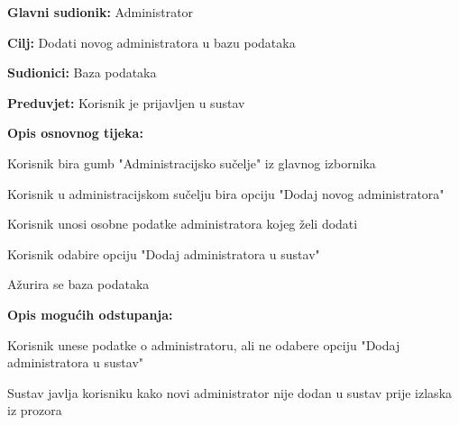 					\noindent {}
					\begin{packed_item}
	
						\item \textbf{Glavni sudionik: } Administrator
						\item  \textbf{Cilj:} Dodati novog administratora u bazu podataka
						\item  \textbf{Sudionici:} Baza podataka
						\item  \textbf{Preduvjet:} Korisnik je prijavljen u sustav
						\item  \textbf{Opis osnovnog tijeka:}
						
						\item[] \begin{packed_enum}
	
							\item Korisnik bira gumb "Administracijsko sučelje" iz glavnog izbornika
							\item Korisnik u administracijskom sučelju bira opciju "Dodaj novog administratora"
							\item Korisnik unosi osobne podatke administratora kojeg želi dodati
							\item Korisnik odabire opciju "Dodaj administratora u sustav"
							\item Ažurira se baza podataka

					
						\end{packed_enum}

						\item  \textbf{Opis mogućih odstupanja:}
						
						\item[] \begin{packed_item}
	
							\item[3.a]  Korisnik unese podatke o administratoru, ali ne odabere opciju "Dodaj administratora u sustav"
							\item[] \begin{packed_enum}
								
								\item Sustav javlja korisniku kako novi administrator nije dodan u sustav prije izlaska iz prozora
								
							\end{packed_enum}
							
						\end{packed_item}
			
					\end{packed_item}
				
